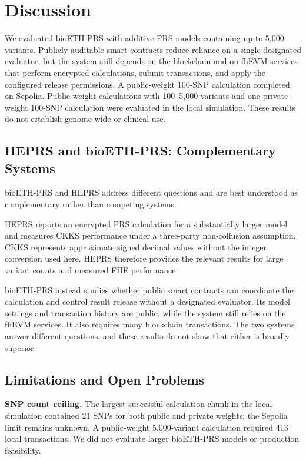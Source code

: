 \documentclass[10pt]{article}
\begin{document}
\section{Discussion}
\label{sec:discussion}

We evaluated bioETH-PRS with additive PRS models containing up to 5,000 variants.  Publicly
auditable smart contracts reduce reliance on a single designated evaluator, but
the system still depends on the blockchain and on fhEVM services that perform encrypted
calculations, submit transactions, and apply the configured release permissions.  A public-weight 100-SNP
calculation completed on Sepolia.  Public-weight calculations with 100--5,000 variants
and one private-weight 100-SNP calculation were evaluated in the local simulation.
These results do not establish genome-wide or clinical use.

\subsection{HEPRS and bioETH-PRS: Complementary Systems}

bioETH-PRS and HEPRS \citep{knight2026heprs} address different questions and are best
understood as complementary rather than competing systems.

HEPRS reports an encrypted PRS calculation for a substantially larger model and measures
CKKS performance under a three-party non-collusion assumption.  CKKS represents
approximate signed decimal values without the integer conversion used here.  HEPRS
therefore provides the relevant results for large variant counts and measured FHE
performance.

bioETH-PRS instead studies whether public smart contracts can coordinate the calculation
and control result release without a designated evaluator.  Its model
settings and transaction history are public, while the system still relies on the fhEVM
services.  It also requires many blockchain transactions.  The two systems answer
different questions, and these results do not show that either is broadly superior.

\subsection{Limitations and Open Problems}

\textbf{SNP count ceiling.}
The largest successful calculation chunk in the local simulation contained 21 SNPs for
both public and private weights; the Sepolia limit remains unknown.  A public-weight
5,000-variant calculation required 413 local transactions.  We did not evaluate larger
bioETH-PRS models or production feasibility.
\end{document}
